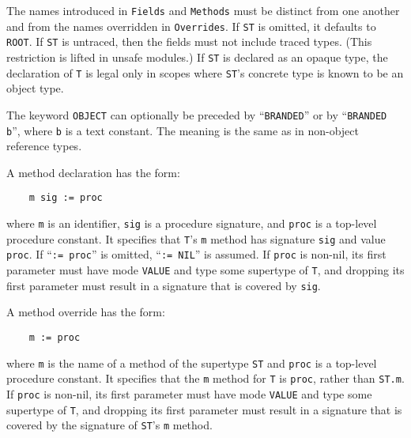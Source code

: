 \documentclass[10pt]{article}
\begin{document}
The names introduced in \verb|Fields| and \verb|Methods| must be distinct from
one another and from the names overridden in \verb|Overrides|.  If \verb|ST|
is omitted, it defaults to \verb|ROOT|.  If \verb|ST| is untraced, then the
fields must not include traced types.  (This restriction is lifted in unsafe
modules.)  If \verb|ST| is declared as an opaque type, the declaration of
\verb|T| is legal only in scopes where \verb|ST|'s concrete type is known to
be an object type.

The keyword \verb|OBJECT| can optionally be preceded by ``\verb|BRANDED|'' or
by ``\verb|BRANDED b|'', where \verb|b| is a text constant.  The meaning is
the same as in non-object reference types.

A method declaration has the form:
\begin{verbatim}
    m sig := proc
\end{verbatim}
where \verb|m| is an identifier, \verb|sig| is a procedure signature, and
\verb|proc| is a top-level procedure constant.  It specifies that \verb|T|'s
\verb|m| method has signature \verb|sig| and value \verb|proc|.  If
``\verb|:= proc|'' is omitted, ``\verb|:= NIL|'' is assumed.  If \verb|proc|
is non-nil, its first parameter must have mode \verb|VALUE| and type some
supertype of \verb|T|, and dropping its first parameter must result in a
signature that is covered by \verb|sig|.

A method override has the form:
\begin{verbatim}
    m := proc
\end{verbatim}
where \verb|m| is the name of a method of the supertype \verb|ST| and
\verb|proc| is a top-level procedure constant.  It specifies that the \verb|m|
method for \verb|T| is \verb|proc|, rather than \verb|ST.m|.  If \verb|proc|
is non-nil, its first parameter must have mode \verb|VALUE| and type some
supertype of \verb|T|, and dropping its first parameter must result in a
signature that is covered by the signature of \verb|ST|'s \verb|m| method.
\end{document}
